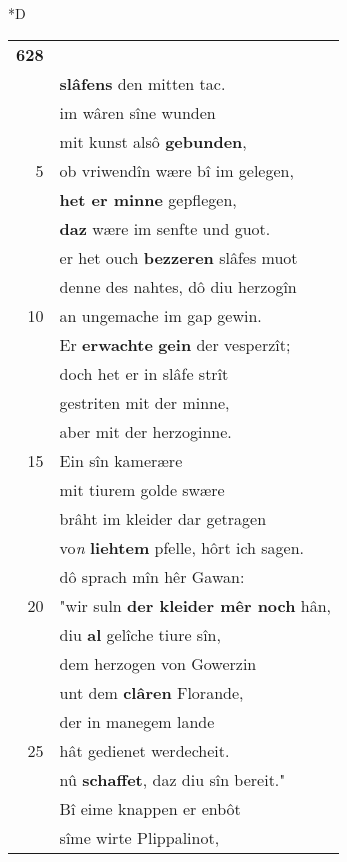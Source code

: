 \documentclass[8pt,a4paper,notitlepage]{article}
\begin{document}
\begin{table}[ht]
\begin{minipage}[t]{0.5\linewidth}
\small
\begin{center}*D
\end{center}
\begin{tabular}{rl}
\textbf{628} & \textit{\begin{large}G\end{large}}awan nâch arbeite pflac\\ 
 & \textbf{slâfens} den mitten tac.\\ 
 & im wâren sîne wunden\\ 
 & mit kunst alsô \textbf{gebunden},\\ 
5 & ob vriwendîn wære bî im gelegen,\\ 
 & \textbf{het er minne} gepflegen,\\ 
 & \textbf{daz} wære im senfte und guot.\\ 
 & er het ouch \textbf{bezzeren} slâfes muot\\ 
 & denne des nahtes, dô diu herzogîn\\ 
10 & an ungemache im gap gewin.\\ 
 & Er \textbf{erwachte} \textbf{gein} der vesperzît;\\ 
 & doch het er in slâfe strît\\ 
 & gestriten mit der minne,\\ 
 & aber mit der herzoginne.\\ 
15 & Ein sîn kamerære\\ 
 & mit tiurem golde swære\\ 
 & brâht im kleider dar getragen\\ 
 & vo\textit{n} \textbf{liehtem} pfelle, hôrt ich sagen.\\ 
 & dô sprach mîn hêr Gawan:\\ 
20 & "wir suln \textbf{der kleider mêr noch} hân,\\ 
 & diu \textbf{al} gelîche tiure sîn,\\ 
 & dem herzogen von Gowerzin\\ 
 & unt dem \textbf{clâren} Florande,\\ 
 & der in manegem lande\\ 
25 & hât gedienet werdecheit.\\ 
 & nû \textbf{schaffet}, daz diu sîn bereit."\\ 
 & Bî eime knappen er enbôt\\ 
 & sîme wirte Plippalinot,\\ 

\end{tabular}
\end{minipage}
\end{table}
\end{document}
